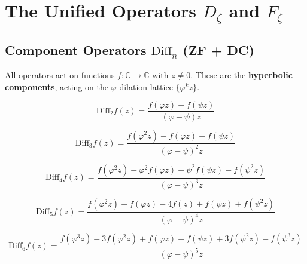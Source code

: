 \chapter{The Unified Operators \texorpdfstring{$D_\zeta$}{Dζ} and \texorpdfstring{$F_\zeta$}{Fζ}}
\label{chap:unified_operator}

\section{Component Operators \texorpdfstring{$\mathrm{Diff}_n$}{Diffn} (ZF + DC)}
\label{sec:component_operators}

All operators act on functions $f : \mathbb{C} \to \mathbb{C}$ with $z \neq 0$. These are the \textbf{hyperbolic components}, acting on the $\varphi$-dilation lattice $\{\varphi^k z\}$.

\begin{definition}
\label{def:Diff2}
\leanok
\[
\mathrm{Diff}_2 f(z) = \frac{f(\varphi z)-f(\psi z)}{(\varphi-\psi)z}
\]
\end{definition}

\begin{definition}
\label{def:Diff3}
\[
\mathrm{Diff}_3 f(z) = \frac{f(\varphi^2 z) - f(\varphi z) + f(\psi z)}{(\varphi-\psi)^2 z}
\]
\end{definition}

\begin{definition}
\label{def:Diff4}
\[
\mathrm{Diff}_4 f(z) = \frac{f(\varphi^2 z) - \varphi^2 f(\varphi z) + \psi^2 f(\psi z) - f(\psi^2 z)}{(\varphi-\psi)^3 z}
\]
\end{definition}

\begin{definition}
\label{def:Diff5}
\leanok
\[
\mathrm{Diff}_5 f(z) = \frac{f(\varphi^2 z) + f(\varphi z) - 4f(z) + f(\psi z) + f(\psi^2 z)}{(\varphi-\psi)^4 z}
\]
\end{definition}

\begin{definition}
\label{def:Diff6}
\leanok
\[
\mathrm{Diff}_6 f(z) = \frac{f(\varphi^3 z) - 3f(\varphi^2 z) + f(\varphi z) - f(\psi z) + 3f(\psi^2 z) - f(\psi^3 z)}{(\varphi-\psi)^5 z}
\]
\end{definition}

